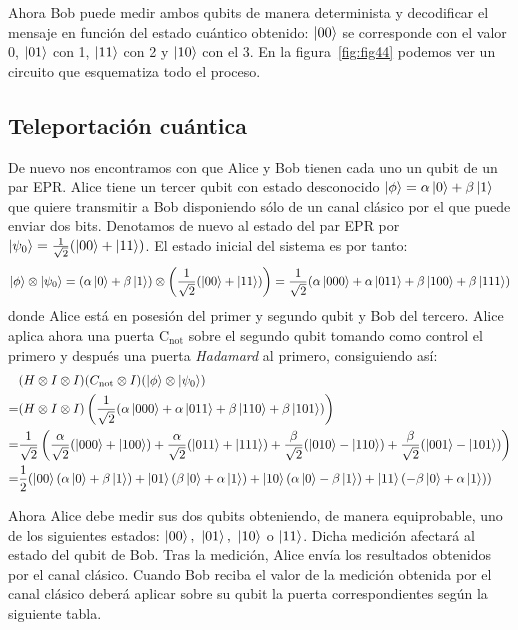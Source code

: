 Ahora Bob puede medir ambos qubits de manera determinista y decodificar el mensaje en función del estado cuántico obtenido: $\left|00\right\rangle$ se corresponde con el valor 0, $\left|01\right\rangle$ con 1, $\left|11\right\rangle$ con 2 y $\left|10\right\rangle$ con el 3. En la figura~\ref{fig:fig44} podemos ver un circuito que esquematiza todo el proceso.

\subsection{Teleportación cuántica}

De nuevo nos encontramos con que Alice y Bob tienen cada uno un qubit de un par EPR. Alice tiene un tercer qubit con estado desconocido $\left|\phi\right\rangle=\alpha\left|0\right\rangle+\beta\left|1\right\rangle$ que quiere transmitir a Bob disponiendo sólo de un canal clásico por el que puede enviar dos bits. Denotamos de nuevo al estado del par EPR por $\left|\psi_0\right\rangle=\frac{1}{\sqrt{2}}(\left|00\right\rangle+\left|11\right\rangle)$. El estado inicial del sistema es por tanto:
$$\left|\phi\right\rangle\otimes\left|\psi_0\right\rangle=(\alpha\left|0\right\rangle+\beta\left|1\right\rangle)\otimes\left(\dfrac{1}{\sqrt{2}}(\left|00\right\rangle+\left|11\right\rangle)\right)=\dfrac{1}{\sqrt{2}}(\alpha\left|000\right\rangle+\alpha\left|011\right\rangle+\beta\left|100\right\rangle+\beta\left|111\right\rangle)
$$
donde Alice está en posesión del primer y segundo qubit y Bob del tercero. Alice aplica ahora una puerta C$_\textrm{not}$ sobre el segundo qubit tomando como control el primero y después una puerta \textit{Hadamard} al primero, consiguiendo así:
\[
\begin{split}
&(H\otimes I\otimes I)(C_{\textrm{not}}\otimes I)(\left|\phi\right\rangle\otimes\left|\psi_0\right\rangle)\\
=&(H\otimes I\otimes I)\left(\dfrac{1}{\sqrt{2}}(\alpha\left|000\right\rangle+\alpha\left|011\right\rangle+\beta\left|110\right\rangle+\beta\left|101\right\rangle)\right)\\
=&\dfrac{1}{\sqrt{2}}\left(\dfrac{\alpha}{\sqrt{2}}(\left|000\right\rangle+\left|100\right\rangle)+\dfrac{\alpha}{\sqrt{2}}(\left|011\right\rangle+\left|111\right\rangle)+\dfrac{\beta}{\sqrt{2}}(\left|010\right\rangle-\left|110\right\rangle)+\dfrac{\beta}{\sqrt{2}}(\left|001\right\rangle-\left|101\right\rangle)\right)\\
=&\dfrac{1}{2}(\left|00\right\rangle(\alpha\left|0\right\rangle+\beta\left|1\right\rangle)+\left|01\right\rangle(\beta\left|0\right\rangle+\alpha\left|1\right\rangle)+\left|10\right\rangle(\alpha\left|0\right\rangle-\beta\left|1\right\rangle)+\left|11\right\rangle(-\beta\left|0\right\rangle+\alpha\left|1\right\rangle))
\end{split}
\]

Ahora Alice debe medir sus dos qubits obteniendo, de manera equiprobable, uno de los siguientes estados: $\left|00\right\rangle,\ \left|01\right\rangle,\ \left|10\right\rangle$ o $\left|11\right\rangle$. Dicha medición afectará al estado del qubit de Bob. Tras la medición, Alice envía los resultados obtenidos por el canal clásico. Cuando Bob reciba el valor de la medición obtenida por el canal clásico deberá aplicar sobre su qubit la puerta correspondientes según la siguiente tabla.

